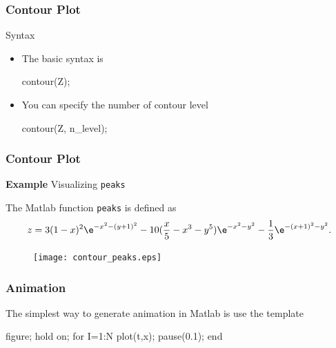 \documentclass[compress]{beamer}  %
\begin{document}
\begin{frame}[fragile]
\frametitle{Contour Plot}

\begin{block}{Syntax}
\begin{itemize}[<+->]
    \item The basic syntax is
          \begin{matlabcodebeamer}[numbers=none,frame=none]
          contour(Z);
          \end{matlabcodebeamer}
    \item You can specify the number of contour level
          \begin{matlabcodebeamer}[numbers=none,frame=none]
          contour(Z, n_level);
          \end{matlabcodebeamer}
\end{itemize}
\end{block}
\end{frame}
\begin{frame}[fragile]
\frametitle{Contour Plot}
\textbf{Example} Visualizing \texttt{peaks}

The Matlab function \texttt{peaks} is defined as
\begin{equation}
    z = 3(1-x)^2 \e^{-x^2 - (y+1)^2} - 10(\frac{x}{5}-x^3-y^5)\e^{-x^2-y^2}-
    \frac{1}{3}\e^{-(x+1)^2-y^2}.
\end{equation}\pause

\setcounter{subfigure}{0}
\begin{figure}
    \centering
    \texttt{[image: contour\_peaks.eps]}
\end{figure}

\end{frame}
\begin{frame}[fragile]
\frametitle{Animation}
The simplest way to generate animation in Matlab is use the template
\begin{matlabcode}[numbers=none,frame=none]
          figure;
          hold on;    
          for I=1:N
              plot(t,x);  %
              pause(0.1); %
          end
\end{matlabcode}

\end{frame}
\end{document}
